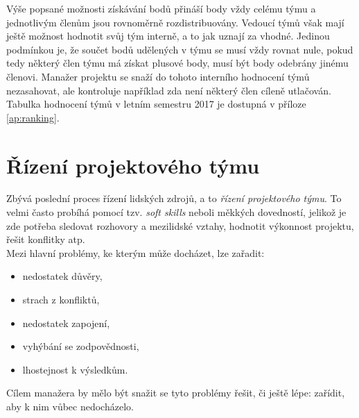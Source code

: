 Výše popsané možnosti získávání bodů přináší body vždy celému týmu a jednotlivým členům jsou rovnoměrně rozdistribuovány. Vedoucí týmů však mají ještě možnost hodnotit svůj tým interně, a to jak uznají za vhodné. Jedinou podmínkou je, že součet bodů udělených v týmu se musí vždy rovnat nule, pokud tedy některý člen týmu má získat plusové body, musí být body odebrány jinému členovi. Manažer projektu se snaží do tohoto interního hodnocení týmů nezasahovat, ale kontroluje například zda není některý člen cíleně utlačován.\\

Tabulka hodnocení týmů v letním semestru 2017 je dostupná v příloze \ref{ap:ranking}.


\section{Řízení projektového týmu}

Zbývá poslední proces řízení lidských zdrojů, a to \emph{řízení projektového týmu}. To velmi často probíhá pomocí tzv. \emph{soft skills} neboli měkkých dovedností, jelikož je zde potřeba sledovat rozhovory a mezilidské vztahy, hodnotit výkonnost projektu, řešit konflitky atp.\\
Mezi hlavní problémy, ke kterým může docházet, lze zařadit:
\begin{itemize}
	\item nedostatek důvěry,
	\item strach z konfliktů,
	\item nedostatek zapojení,
	\item vyhýbání se zodpovědnosti,
	\item lhostejnost k výsledkům.
\end{itemize}
Cílem manažera by mělo být snažit se tyto problémy řešit, či ještě lépe: zařídit, aby k nim vůbec nedocházelo.

